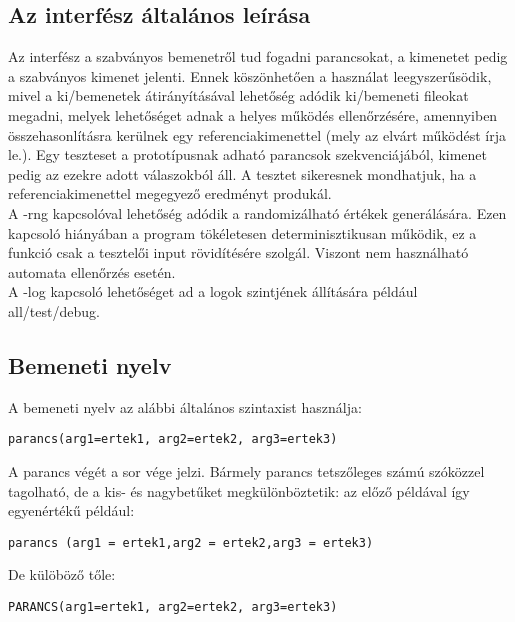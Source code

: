 \subsection{Az interfész általános leírása}
Az interfész a szabványos bemenetről tud fogadni parancsokat, a kimenetet pedig a szabványos kimenet jelenti. Ennek köszönhetően a használat
leegyszerűsödik, mivel a ki/bemenetek átirányításával lehetőség adódik ki/bemeneti fileokat megadni, melyek lehetőséget adnak a helyes működés
ellenőrzésére, amennyiben összehasonlításra kerülnek egy referenciakimenettel (mely az elvárt működést írja le.). Egy teszteset a prototípusnak
adható parancsok szekvenciájából, kimenet pedig az ezekre adott válaszokból áll. A tesztet sikeresnek mondhatjuk, ha a referenciakimenettel 
megegyező eredményt produkál. \\
A -rng kapcsolóval lehetőség adódik a randomizálható értékek generálására. Ezen kapcsoló hiányában a program tökéletesen determinisztikusan működik,
ez a funkció csak a tesztelői input rövidítésére szolgál. Viszont nem használható automata ellenőrzés esetén.\\
A -log kapcsoló lehetőséget ad a logok szintjének állítására például all/test/debug. \\

\subsection{Bemeneti nyelv}
A bemeneti nyelv az alábbi általános szintaxist használja: 

\lstset{escapeinside=`', xleftmargin=10pt, frame=single, basicstyle=\ttfamily\footnotesize, language=sh}
\begin{lstlisting}
parancs(arg1=ertek1, arg2=ertek2, arg3=ertek3)
\end{lstlisting}

\noindent A parancs végét a sor vége jelzi. Bármely parancs tetszőleges számú szóközzel tagolható, de a kis- és nagybetűket megkülönböztetik: az előző példával így egyenértékű például:

\lstset{escapeinside=`', xleftmargin=10pt, frame=single, basicstyle=\ttfamily\footnotesize, language=sh}
\begin{lstlisting}
parancs (arg1 = ertek1,arg2 = ertek2,arg3 = ertek3)
\end{lstlisting}

\noindent De külöböző tőle:

\lstset{escapeinside=`', xleftmargin=10pt, frame=single, basicstyle=\ttfamily\footnotesize, language=sh}
\begin{lstlisting}
PARANCS(arg1=ertek1, arg2=ertek2, arg3=ertek3)
\end{lstlisting}

